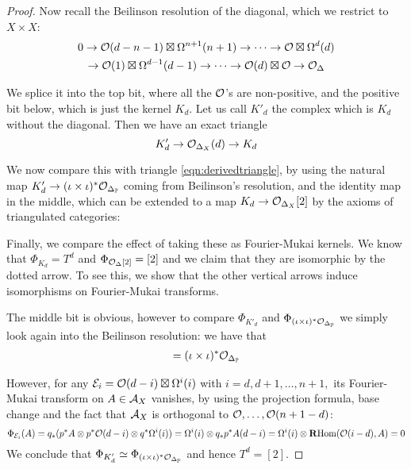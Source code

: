 \begin{proof}
    Now recall the Beilinson resolution of the diagonal, which we restrict to $X\times X$:\begin{gather*}
        0 \rightarrow \mathcal{O} (d-n-1)\boxtimes \Omega^{n+1}(n+1)\rightarrow \dots \rightarrow \mathcal{O} \boxtimes \Omega^{d}(d)\\
        \rightarrow \mathcal{O}(1)\boxtimes \Omega^{d-1}(d-1)\rightarrow \dots \rightarrow \mathcal{O}(d)\boxtimes \mathcal{O} \rightarrow \mathcal{O}_\Delta
    \end{gather*}

    We splice it into the top bit, where all the $\mathcal{O}$'s are non-positive, and the positive bit below, which is just the kernel $K_d$. Let us call $K'_d$ the complex which is $K_d$ without the diagonal. Then we have an exact triangle $$K'_d \rightarrow \mathcal{O}_{\Delta_X}(d)\rightarrow K_d$$

    We now compare this with triangle \ref{eqn:derivedtriangle}, by using the natural map $K'_d \rightarrow (\iota\times \iota)^*\mathcal{O}_{\Delta_{\mathbb{P}}}$ coming from Beilinson's resolution, and the identity map in the middle, which can be extended to a map $K_d \rightarrow \mathcal{O}_{\Delta_X}[2]$ by the axioms of triangulated categories: 

    \begin{center}\end{center}

    Finally, we compare the effect of taking these as Fourier-Mukai kernels. We know that $\Phi_{K_d}=T^d$ and $\Phi_{\mathcal{O}_\Delta [2]}=[2]$ and we claim that they are isomorphic by the dotted arrow. To see this, we show that the other vertical arrows induce isomorphisms on Fourier-Mukai transforms.

    The middle bit is obvious, however to compare $\Phi_{K'_d}$ and $\Phi_{(\iota\times \iota)^*\mathcal{O}_{\Delta_{\mathbb{P}}}}$ we simply look again into the Beilinson resolution: we have that \begin{gather*}
        [ \O (d-n-1)\boxtimes \Omega^{n+1}(n+1)\rightarrow \dots \rightarrow \O \boxtimes \Omega^{d}(d)\rightarrow K'_d]=(\iota\times \iota)^*\O_{\Delta_\P}
    \end{gather*}

    However, for any $\mathcal{E}_i=\mathcal{O}(d-i)\boxtimes \Omega^i(i)$ with $i=d,d+1,\dots,n+1,$ its Fourier-Mukai transform on $A\in \mathcal{A}_X$ vanishes, by using the projection formula, base change and the fact that $\mathcal{A}_X$ is orthogonal to $\mathcal{O},\dots, \mathcal{O}(n+1-d)$:$$\Phi_{\mathcal{E}_i}(A)=q_*(p^*A\otimes p^* \mathcal{O}(d-i)\otimes q^* \Omega^i(i))=\Omega^i(i)\otimes q_*p^* A(d-i)=\Omega^i(i) \otimes \operatorname{\mathbf{R} Hom}(\mathcal{O}(i-d),A)=0$$ We conclude that $\Phi_{K'_d}\simeq \Phi_{(\iota\times \iota)^*\mathcal{O}_{\Delta_{\mathbb{P}}}}$ and hence $T^d=[2]$.
\end{proof}

